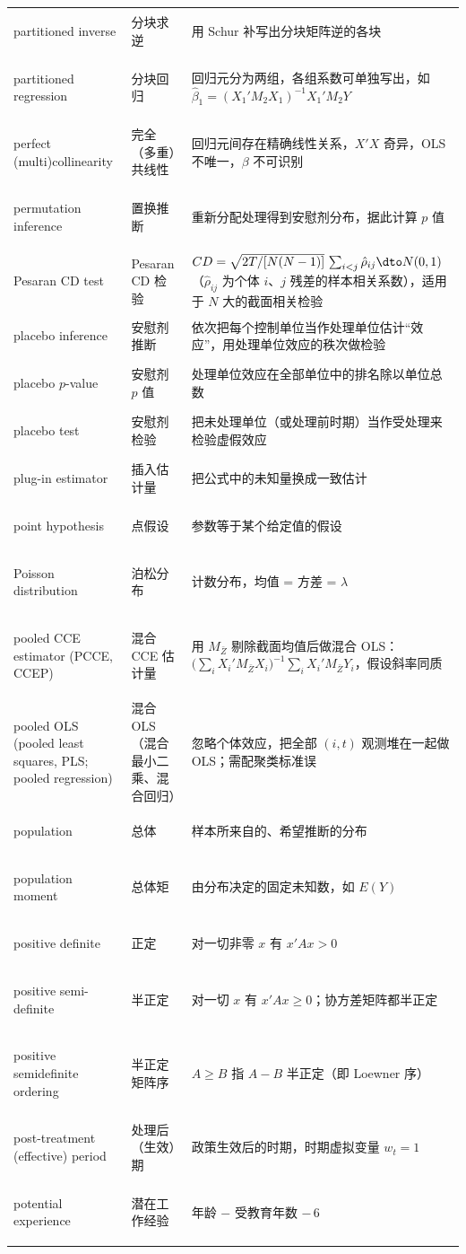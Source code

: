 \begin{longtable}{@{}>{\bfseries\boldmath\raggedright\arraybackslash}p{4.6cm}>{\raggedright\arraybackslash}p{3.2cm}>{\raggedright\arraybackslash}p{\dimexpr\textwidth-7.8cm-4\tabcolsep\relax}@{}}
partitioned inverse & 分块求逆 & 用 Schur 补写出分块矩阵逆的各块 \\
partitioned regression & 分块回归 & 回归元分为两组，各组系数可单独写出，如 $\hat\beta_1=(X_1'M_2X_1)^{-1}X_1'M_2Y$ \\
perfect (multi)collinearity & 完全（多重）共线性 & 回归元间存在精确线性关系，$X'X$ 奇异，OLS 不唯一，$\beta$ 不可识别 \\
permutation inference & 置换推断 & 重新分配处理得到安慰剂分布，据此计算 $p$ 值 \\
Pesaran CD test & Pesaran CD 检验 & $CD=\sqrt{2T/[N(N-1)]}\,\sum_{i<j}\hat\rho_{ij}\dto N(0,1)$（$\hat\rho_{ij}$ 为个体 $i$、$j$ 残差的样本相关系数），适用于 $N$ 大的截面相关检验 \\
placebo inference & 安慰剂推断 & 依次把每个控制单位当作处理单位估计“效应”，用处理单位效应的秩次做检验 \\
placebo $p$-value & 安慰剂 $p$ 值 & 处理单位效应在全部单位中的排名除以单位总数 \\
placebo test & 安慰剂检验 & 把未处理单位（或处理前时期）当作受处理来检验虚假效应 \\
plug-in estimator & 插入估计量 & 把公式中的未知量换成一致估计 \\
point hypothesis & 点假设 & 参数等于某个给定值的假设 \\
Poisson distribution & 泊松分布 & 计数分布，均值 = 方差 = $\lambda$ \\
pooled CCE estimator (PCCE, CCEP) & 混合 CCE 估计量 & 用 $M_{\bar Z}$ 剔除截面均值后做混合 OLS：$\big(\sum_iX_i'M_{\bar Z}X_i\big)^{-1}\sum_iX_i'M_{\bar Z}Y_i$，假设斜率同质 \\
pooled OLS (pooled least squares, PLS; pooled regression) & 混合 OLS（混合最小二乘、混合回归） & 忽略个体效应，把全部 $(i,t)$ 观测堆在一起做 OLS；需配聚类标准误 \\
population & 总体 & 样本所来自的、希望推断的分布 \\
population moment & 总体矩 & 由分布决定的固定未知数，如 $E(Y)$ \\
positive definite & 正定 & 对一切非零 $x$ 有 $x'Ax>0$ \\
positive semi-definite & 半正定 & 对一切 $x$ 有 $x'Ax\ge0$；协方差矩阵都半正定 \\
positive semidefinite ordering & 半正定矩阵序 & $A\ge B$ 指 $A-B$ 半正定（即 Loewner 序） \\
post-treatment (effective) period & 处理后（生效）期 & 政策生效后的时期，时期虚拟变量 $w_t=1$ \\
potential experience & 潜在工作经验 & 年龄 $-$ 受教育年数 $-\,6$ \\

\end{longtable}
